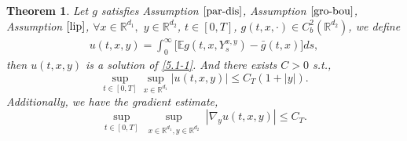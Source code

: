 \documentclass[11pt,reqno]{amsart}
\newtheorem{theorem}{\indent Theorem}[section]
\numberwithin{equation}{section}
\begin{document}
\begin{theorem}\label{T51-1}
Let $g$ satisfies Assumption $\ref{par-dis}$,  Assumption $\ref{gro-bou}$,  Assumption $\ref{lip}$,	$\forall x\in \mathbb{R}^{d_{1}}, $  $y\in \mathbb{R}^{d_{2}} $,  $t\in [0,T]$,  $g(t,x,\cdot)\in C_{b}^{ 2}(\mathbb{R}^{d_{2}})$, we define 
	\begin{equation}\label{5.2-1}
		\begin{split}
			u(t,x,y)=\int^{\infty}_{0} \big[\mathbb{E}g(t,x,Y_{s}^{x,y})-\bar{g}(t,x)\big]ds,
		\end{split}
	\end{equation}
	then $u(t,x,y)$  is a solution of \eqref{5.1-1}. And %
	there exists $ C>0$ s.t.,
	\begin{equation}\label{5.3-1}
		\sup_{t\in [0,T]}\sup_{x\in \mathbb{R}^{d_{1}}}|u(t,x,y)|\leq C_T(1+|y|).
	\end{equation}
Additionally, we have the gradient estimate, %
\begin{equation}\label{5.4-1}
		\sup_{t\in [0,T]} \sup_{\substack{x\in \mathbb{R}^{d_{1}}, y\in \mathbb{R}^{d_{2}}}}|\nabla_{y}u(t,x,y)|\leq C_T.
	\end{equation}
\end{theorem}
\end{document}
